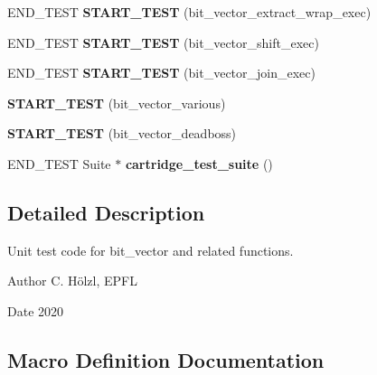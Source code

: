 \begin{DoxyCompactItemize}
\item 
\mbox{\label{unit-test-bit-vector_8c_aeec3636f7c8b7ea6b271844806eb9a03}} 
E\+N\+D\+\_\+\+T\+E\+ST {\bfseries S\+T\+A\+R\+T\+\_\+\+T\+E\+ST} (bit\+\_\+vector\+\_\+extract\+\_\+wrap\+\_\+exec)
\item 
\mbox{\label{unit-test-bit-vector_8c_a9f17964cf79cb348120555c500569c38}} 
E\+N\+D\+\_\+\+T\+E\+ST {\bfseries S\+T\+A\+R\+T\+\_\+\+T\+E\+ST} (bit\+\_\+vector\+\_\+shift\+\_\+exec)
\item 
\mbox{\label{unit-test-bit-vector_8c_af31980f4645ce4df32f561b6af1b8de7}} 
E\+N\+D\+\_\+\+T\+E\+ST {\bfseries S\+T\+A\+R\+T\+\_\+\+T\+E\+ST} (bit\+\_\+vector\+\_\+join\+\_\+exec)
\item 
\mbox{\label{unit-test-bit-vector_8c_a1f8ab9898078f50407e65a2622f4f945}} 
{\bfseries S\+T\+A\+R\+T\+\_\+\+T\+E\+ST} (bit\+\_\+vector\+\_\+various)
\item 
\mbox{\label{unit-test-bit-vector_8c_afa72842ec5900330b255a8a5dbcf6d27}} 
{\bfseries S\+T\+A\+R\+T\+\_\+\+T\+E\+ST} (bit\+\_\+vector\+\_\+deadboss)
\item 
\mbox{\label{unit-test-bit-vector_8c_ae9bf8497ac3c350f625969edfe7ca4df}} 
E\+N\+D\+\_\+\+T\+E\+ST Suite $\ast$ {\bfseries cartridge\+\_\+test\+\_\+suite} ()
\end{DoxyCompactItemize}


\subsection{Detailed Description}
Unit test code for bit\+\_\+vector and related functions. 

\begin{DoxyAuthor}{Author}
C. Hölzl, E\+P\+FL 
\end{DoxyAuthor}
\begin{DoxyDate}{Date}
2020 
\end{DoxyDate}


\subsection{Macro Definition Documentation}
\mbox{\label{unit-test-bit-vector_8c_a85470dd17aea2a0f0c8ad68fe4a08cf1}} 
